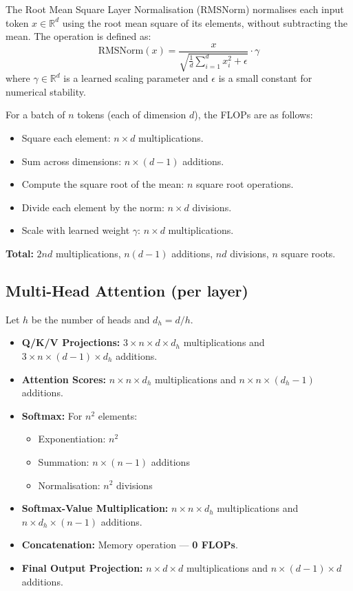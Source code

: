 \documentclass[a4paper,12pt]{article}
\begin{document}
The Root Mean Square Layer Normalisation (RMSNorm) \citep{zhang2019root} normalises each input token $x \in \mathbb{R}^d$ using the root mean square of its elements, without subtracting the mean. The operation is defined as:
\begin{equation}
\text{RMSNorm}(x) = \frac{x}{\sqrt{\frac{1}{d} \sum_{i=1}^{d} x_i^2 + \epsilon}} \cdot \gamma
\end{equation}
where $\gamma \in \mathbb{R}^d$ is a learned scaling parameter and $\epsilon$ is a small constant for numerical stability.

For a batch of $n$ tokens (each of dimension $d$), the FLOPs are as follows:
\begin{itemize}
  \item Square each element: $n \times d$ multiplications.
  \item Sum across dimensions: $n \times (d - 1)$ additions.
  \item Compute the square root of the mean: $n$ square root operations.
  \item Divide each element by the norm: $n \times d$ divisions.
  \item Scale with learned weight $\gamma$: $n \times d$ multiplications.
\end{itemize}

\textbf{Total:} $2nd$ multiplications, $n(d - 1)$ additions, $nd$ divisions, $n$ square roots.


\subsection*{Multi-Head Attention (per layer)}
Let $h$ be the number of heads and $d_h = d / h$.
\begin{itemize}
  \item \textbf{Q/K/V Projections:} $3 \times n \times d \times d_h$ multiplications and $3 \times n \times (d - 1) \times d_h$ additions.
  \item \textbf{Attention Scores:} $n \times n \times d_h$ multiplications and $n \times n \times (d_h - 1)$ additions.
  \item \textbf{Softmax:} For $n^2$ elements:
    \begin{itemize}
      \item Exponentiation: $n^2$
      \item Summation: $n \times (n - 1)$ additions
      \item Normalisation: $n^2$ divisions
    \end{itemize}
  \item \textbf{Softmax-Value Multiplication:} $n \times n \times d_h$ multiplications and $n \times d_h \times (n - 1)$ additions.
  \item \textbf{Concatenation:} Memory operation — \textbf{0 FLOPs}.
  \item \textbf{Final Output Projection:} $n \times d \times d$ multiplications and $n \times (d - 1) \times d$ additions.
\end{itemize}
\end{document}
